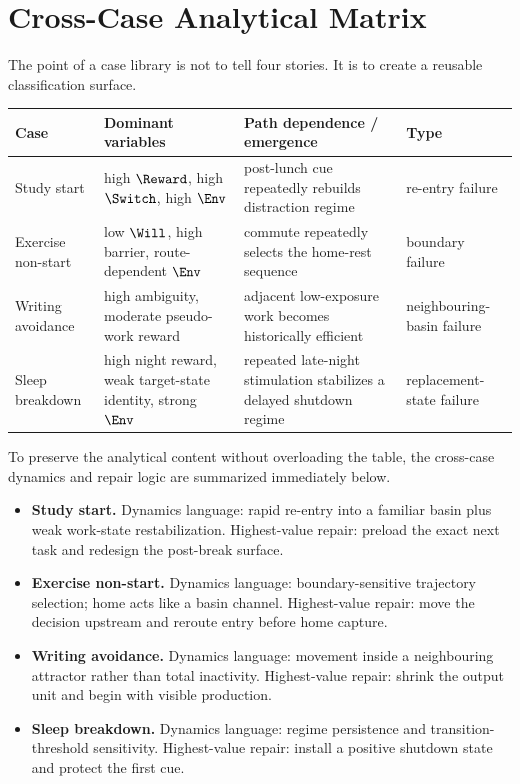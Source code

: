 \section{Cross-Case Analytical Matrix}

The point of a case library is not to tell four stories. It is to create a
reusable classification surface.

\begin{center}
\begin{tabularx}{\textwidth}{@{}l l X X@{}}
\toprule
Case & Dominant variables & Path dependence / emergence & Type \\
\midrule
Study start &
high $\Reward$, high $\Switch$, high $\Env$ &
post-lunch cue repeatedly rebuilds distraction regime &
re-entry failure \\

Exercise non-start &
low $\Will$, high barrier, route-dependent $\Env$ &
commute repeatedly selects the home-rest sequence &
boundary failure \\

Writing avoidance &
high ambiguity, moderate pseudo-work reward &
adjacent low-exposure work becomes historically efficient &
neighbouring-basin failure \\

Sleep breakdown &
high night reward, weak target-state identity, strong $\Env$ &
repeated late-night stimulation stabilizes a delayed shutdown regime &
replacement-state failure \\
\bottomrule
\end{tabularx}
\end{center}

To preserve the analytical content without overloading the table, the
cross-case dynamics and repair logic are summarized immediately below.

\begin{itemize}[nosep]
  \item \textbf{Study start.} Dynamics language: rapid re-entry into a familiar
        basin plus weak work-state restabilization. Highest-value repair:
        preload the exact next task and redesign the post-break surface.
  \item \textbf{Exercise non-start.} Dynamics language: boundary-sensitive
        trajectory selection; home acts like a basin channel. Highest-value
        repair: move the decision upstream and reroute entry before home
        capture.
  \item \textbf{Writing avoidance.} Dynamics language: movement inside a
        neighbouring attractor rather than total inactivity. Highest-value
        repair: shrink the output unit and begin with visible production.
  \item \textbf{Sleep breakdown.} Dynamics language: regime persistence and
        transition-threshold sensitivity. Highest-value repair: install a
        positive shutdown state and protect the first cue.
\end{itemize}
